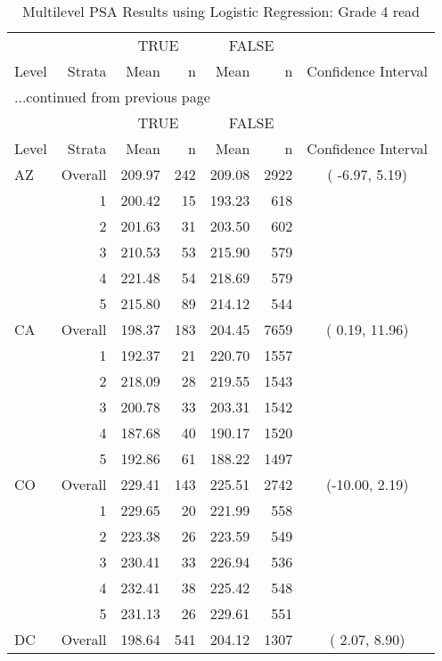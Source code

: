 \begin{longtable}{lrrr@{\extracolsep{.25cm}}rrc}
\caption{Multilevel PSA Results using Logistic Regression: Grade 4 read} \\ 
   \hline & & \multicolumn{2}{c}{TRUE} & \multicolumn{2}{c}{FALSE} & \\ \cline{3-4} \cline{5-6} Level & Strata & Mean & n & Mean & n & Confidence Interval \\ \hline\endfirsthead \multicolumn{7}{l}{{...continued from previous page}}\\ \hline  & & \multicolumn{2}{c}{TRUE} & \multicolumn{2}{c}{FALSE} & \\ \cline{3-4} \cline{5-6} Level & Strata & Mean & n & Mean & n & Confidence Interval \\ \hline \endhead \endfoot \endlastfoot  \hline
AZ & Overall & 209.97 & 242 & 209.08 & 2922 & ( -6.97,   5.19) \\ 
   & 1 & 200.42 &  15 & 193.23 & 618 &  \\ 
   & 2 & 201.63 &  31 & 203.50 & 602 &  \\ 
   & 3 & 210.53 &  53 & 215.90 & 579 &  \\ 
   & 4 & 221.48 &  54 & 218.69 & 579 &  \\ 
   & 5 & 215.80 &  89 & 214.12 & 544 &  \\ 
   \hline
CA & Overall & 198.37 & 183 & 204.45 & 7659 & (  0.19,  11.96) \\ 
   & 1 & 192.37 &  21 & 220.70 & 1557 &  \\ 
   & 2 & 218.09 &  28 & 219.55 & 1543 &  \\ 
   & 3 & 200.78 &  33 & 203.31 & 1542 &  \\ 
   & 4 & 187.68 &  40 & 190.17 & 1520 &  \\ 
   & 5 & 192.86 &  61 & 188.22 & 1497 &  \\ 
   \hline
CO & Overall & 229.41 & 143 & 225.51 & 2742 & (-10.00,   2.19) \\ 
   & 1 & 229.65 &  20 & 221.99 & 558 &  \\ 
   & 2 & 223.38 &  26 & 223.59 & 549 &  \\ 
   & 3 & 230.41 &  33 & 226.94 & 536 &  \\ 
   & 4 & 232.41 &  38 & 225.42 & 548 &  \\ 
   & 5 & 231.13 &  26 & 229.61 & 551 &  \\ 
   \hline
DC & Overall & 198.64 & 541 & 204.12 & 1307 & (  2.07,   8.90) \\ 

\end{longtable}
